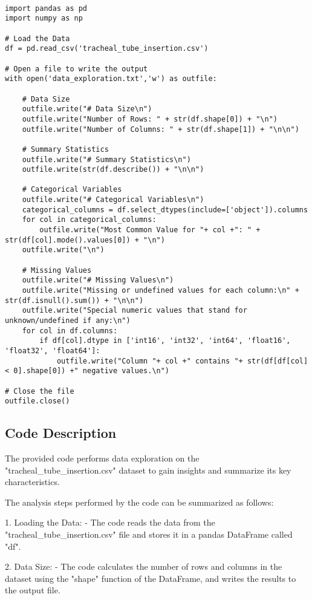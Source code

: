 \documentclass[11pt]{article}
\begin{document}
\begin{verbatim}

import pandas as pd
import numpy as np

# Load the Data
df = pd.read_csv('tracheal_tube_insertion.csv')

# Open a file to write the output
with open('data_exploration.txt','w') as outfile:
   
    # Data Size
    outfile.write("# Data Size\n")
    outfile.write("Number of Rows: " + str(df.shape[0]) + "\n")
    outfile.write("Number of Columns: " + str(df.shape[1]) + "\n\n")

    # Summary Statistics
    outfile.write("# Summary Statistics\n")
    outfile.write(str(df.describe()) + "\n\n")

    # Categorical Variables
    outfile.write("# Categorical Variables\n")
    categorical_columns = df.select_dtypes(include=['object']).columns
    for col in categorical_columns:
        outfile.write("Most Common Value for "+ col +": " + str(df[col].mode().values[0]) + "\n")
    outfile.write("\n")

    # Missing Values
    outfile.write("# Missing Values\n")
    outfile.write("Missing or undefined values for each column:\n" + str(df.isnull().sum()) + "\n\n")
    outfile.write("Special numeric values that stand for unknown/undefined if any:\n")
    for col in df.columns:
        if df[col].dtype in ['int16', 'int32', 'int64', 'float16', 'float32', 'float64']:
            outfile.write("Column "+ col +" contains "+ str(df[df[col] < 0].shape[0]) +" negative values.\n")
            
# Close the file        
outfile.close()

\end{verbatim}

\subsection{Code Description}

The provided code performs data exploration on the "tracheal\_tube\_insertion.csv" dataset to gain insights and summarize its key characteristics. 

The analysis steps performed by the code can be summarized as follows:

1. Loading the Data:
   - The code reads the data from the "tracheal\_tube\_insertion.csv" file and stores it in a pandas DataFrame called "df".

2. Data Size:
   - The code calculates the number of rows and columns in the dataset using the "shape" function of the DataFrame, and writes the results to the output file.
\end{document}
